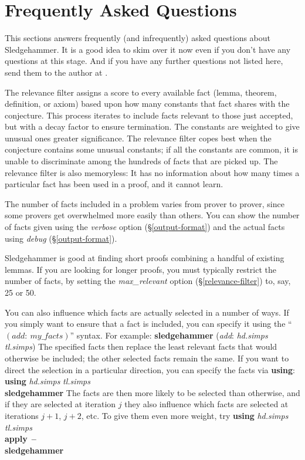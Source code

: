 \documentclass[a4paper,12pt]{article}
\begin{document}
\section{Frequently Asked Questions}
\label{frequently-asked-questions}

This sections answers frequently (and infrequently) asked questions about
Sledgehammer. It is a good idea to skim over it now even if you don't have any
questions at this stage. And if you have any further questions not listed here,
send them to the author at \authoremail.


The relevance filter assigns a score to every available fact (lemma, theorem,
definition, or axiom) based upon how many constants that fact shares with the
conjecture. This process iterates to include facts relevant to those just
accepted, but with a decay factor to ensure termination. The constants are
weighted to give unusual ones greater significance. The relevance filter copes
best when the conjecture contains some unusual constants; if all the constants
are common, it is unable to discriminate among the hundreds of facts that are
picked up. The relevance filter is also memoryless: It has no information about
how many times a particular fact has been used in a proof, and it cannot learn.

The number of facts included in a problem varies from prover to prover, since
some provers get overwhelmed more easily than others. You can show the number of
facts given using the \textit{verbose} option (\S\ref{output-format}) and the
actual facts using \textit{debug} (\S\ref{output-format}).

Sledgehammer is good at finding short proofs combining a handful of existing
lemmas. If you are looking for longer proofs, you must typically restrict the
number of facts, by setting the \textit{max\_relevant} option
(\S\ref{relevance-filter}) to, say, 25 or 50.

You can also influence which facts are actually selected in a number of ways. If
you simply want to ensure that a fact is included, you can specify it using the
``$(\textit{add}{:}~\textit{my\_facts})$'' syntax. For example:
%
\prew
\textbf{sledgehammer} (\textit{add}: \textit{hd.simps} \textit{tl.simps})
\postw
%
The specified facts then replace the least relevant facts that would otherwise be
included; the other selected facts remain the same.
If you want to direct the selection in a particular direction, you can specify
the facts via \textbf{using}:
%
\prew
\textbf{using} \textit{hd.simps} \textit{tl.simps} \\
\textbf{sledgehammer}
\postw
%
The facts are then more likely to be selected than otherwise, and if they are
selected at iteration $j$ they also influence which facts are selected at
iterations $j + 1$, $j + 2$, etc. To give them even more weight, try
%
\prew
\textbf{using} \textit{hd.simps} \textit{tl.simps} \\
\textbf{apply}~\textbf{--} \\
\textbf{sledgehammer}
\postw
\end{document}
